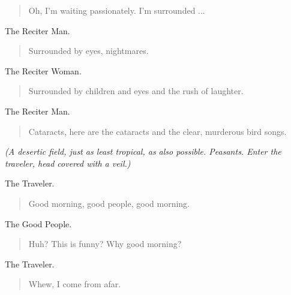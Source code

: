 \documentclass[letterpaper,article,12pt,oneside,notitlepage]{memoir}
\begin{document}
\begin{verse}
Oh, I'm waiting passionately. I'm surrounded ... \\
\end{verse}

\begin{center}The Reciter Man.\end{center}

\begin{verse}
Surrounded by eyes, nightmares. \\
\end{verse}

\begin{center}The Reciter Woman.\end{center}

\begin{verse}
Surrounded by children and eyes and the rush of laughter. \\
\end{verse}

\begin{center}The Reciter Man.\end{center}

\begin{verse}
Cataracts, here are the cataracts and the clear, murderous bird songs. \\
\end{verse}

\textit{(A desertic field, just as least tropical, as also possible. Peasants. Enter the traveler, head covered with a veil.)}

\begin{center}The Traveler.\end{center}

\begin{verse}
Good morning, good people, good morning. \\
\end{verse}

\begin{center}The Good People.\end{center}

\begin{verse}
Huh? This is funny? Why good morning? \\
\end{verse}

\begin{center}The Traveler.\end{center}

\begin{verse}
Whew, I come from afar. \\
\end{verse}
\end{document}
